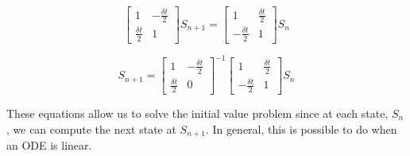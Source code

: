 \documentclass[a4paper,11pt]{report}
\begin{document}
\begin{enumerate}
\begin{itemize}
    \begin{equation*}
    \begin{bmatrix} 1 & -\frac{\delta t}{2} \\ \frac{\delta t}{2} & 1 \end{bmatrix} S_{n+1} = \begin{bmatrix} 1 & \frac{\delta t}{2} \\ -\frac{\delta t}{2} & 1 \end{bmatrix} S_{n}
    \end{equation*}

    \begin{equation*}
    S_{n+1} = \begin{bmatrix} 1 & -\frac{\delta t}{2} \\ \frac{\delta t}{2} & 0 \end{bmatrix}^{-1} \begin{bmatrix} 1 & \frac{\delta t}{2} \\ -\frac{\delta t}{2} & 1 \end{bmatrix} S_{n}
    \end{equation*}
    
    \end{itemize}
       
    These equations allow us to solve the initial value problem since at each state, $S_{n}$, we can compute the next state at $S_{n+1}$. 
    In general, this is possible to do when an ODE is linear.

\end{enumerate}
\end{document}
